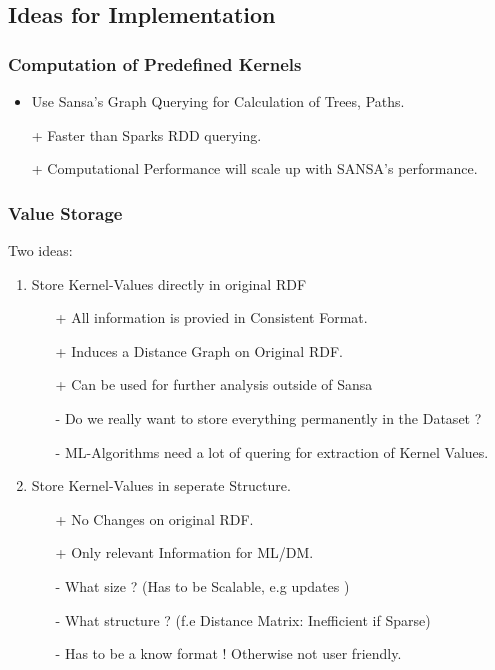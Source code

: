 \subsection{Ideas for Implementation}
\begin{frame}[fragile,t]
\frametitle{Computation of Predefined Kernels}
\begin{itemize}
\item Use Sansa's Graph Querying for Calculation of Trees, Paths.
\pause
\item[+] Faster than Sparks RDD querying. 
\pause
\item[+] Computational Performance will scale up with SANSA's performance.
\end{itemize}
\end{frame}

\begin{frame}[fragile,t]
\frametitle{Value Storage}
Two ideas:
\pause
\begin{enumerate}
\item Store Kernel-Values directly in original RDF
\begin{itemize}
	\item [+] All information is provied in Consistent Format.
	\item [+] Induces a Distance Graph on Original RDF.
	\item [+] Can be used for further analysis outside of Sansa
	\pause
	\item [-] Do we really want to store everything permanently in the Dataset ?
	\item [-] ML-Algorithms need a lot of quering for extraction of Kernel Values.
\end{itemize}
\pause
\item Store Kernel-Values in seperate Structure.
\begin{itemize}
	\item [+] No Changes on original RDF.
	\item [+] Only relevant Information for ML/DM. 
	\pause
	\item [-] What size ? (Has to be Scalable, e.g updates )
	\item [-] What structure ?  (f.e Distance Matrix: Inefficient if Sparse)
	\item [-] Has to be a know format ! Otherwise not user friendly.
\end{itemize}
\end{enumerate}
\end{frame}

